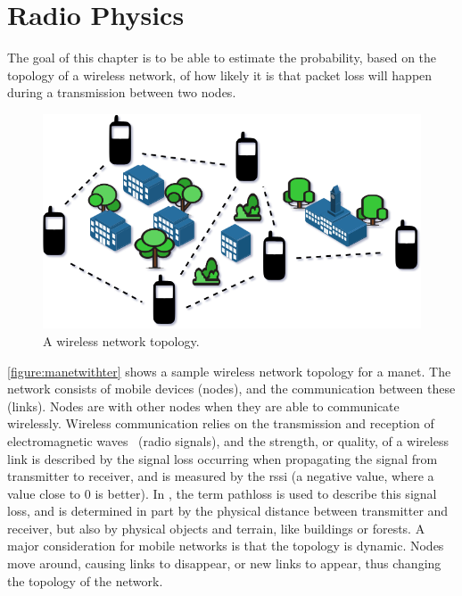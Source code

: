 \chapter{Radio Physics}
The goal of this chapter is to be able to estimate the probability, based on the topology of a wireless
network, of how likely it is that packet loss will happen during a transmission between two nodes.


\begin{figure}[ht]
    \centering
    \includegraphics[width=.7\textwidth]{figures/manet_with_terrain.png}
    \caption{A wireless network topology.}
    \label{figure:manetwithter}
\end{figure}

\autoref{figure:manetwithter} shows a sample wireless network topology for a \acrfull{manet}. The network
consists of mobile devices (nodes), and the communication between these (links). Nodes are
 with other nodes when they are able to communicate wirelessly. Wireless communication
relies on the transmission and reception of electromagnetic waves~\cite[p.~10]{paper:linkmodel} (radio
signals), and the strength, or quality, of a wireless link is described by the signal loss occurring when
propagating the signal from transmitter to receiver, and is measured by the \gls{rssi} (a negative value,
where a value close to 0 is better). In \cite{paper:linkmodel}, the term \gls{pathloss} is used to describe
this signal loss, and is determined in part by the physical distance between transmitter and receiver, but
also by physical objects and terrain, like buildings or forests. A major consideration for mobile networks is
that the topology is dynamic. Nodes move around, causing links to disappear, or new links to appear, thus 
changing the topology of the network.





